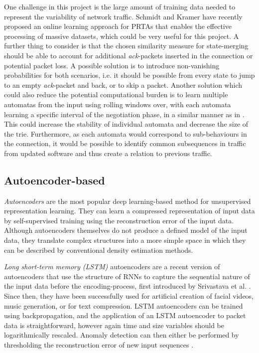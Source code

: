 \documentclass[a4paper,12pt,twoside]{report}
\begin{document}
One challenge in this project is the large amount of training data needed to represent the variability of network traffic. Schmidt and Kramer \cite{schmidt2014online} have recently proposed an online learning approach for PRTAs that enables the effective processing of massive datasets, which could be very useful for this project. A further thing to consider is that the chosen similarity measure for state-merging should be able to account for additional \textit{ack}-packets inserted in the connection or potential packet loss. A possible solution is to introduce non-vanishing probabilities for both scenarios, i.e. it should be possible from every state to jump to an empty \textit{ack}-packet and back, or to skip a packet. Another solution which could also reduce the potential computational burden is to learn multiple automatas from the input using rolling windows over, with each automata learning a specific interval of the negotiation phase, in a similar manner as in \cite{pellegrino2017learning}. This could increase the stability of individual automata and decrease the size of the trie. Furthermore, as each automata would correspond to sub-behaviours in the connection, it would be possible to identify common subsequences in traffic from updated software and thus create a relation to previous traffic. 

\subsection{Autoencoder-based}\label{AUTOBASED}

\textit{Autoencoders} are the most popular deep learning-based method for unsupervised representation learning. They can learn a compressed representation of input data by self-supervised training using the reconstruction error of the input data. Although autoencoders themselves do not produce a defined model of the input data, they translate complex structures into a more simple space in which they can be described by conventional density estimation methods. 

\textit{Long short-term memory (LSTM)} autoencoders are a recent version of autoencoders that use the structure of RNNs to capture the sequential nature of the input data before the encoding-process, first introduced by Srivastava et al. \cite{srivastava2015unsupervised}. Since then, they have been successfully used for artificial creation of facial videos, music generation, or for text compression.
LSTM autoencoders can be trained using backpropagation, and the application of an LSTM autoencoder to packet data is straightforward, however again time and size variables should be logarithmically rescaled. Anomaly detection can then either be performed by thresholding the reconstruction error of new input sequences \cite{malhotra2016lstm}.
 
\end{document}
